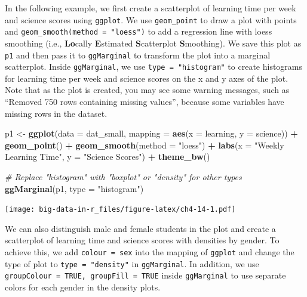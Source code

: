 \documentclass[]{book}
\newenvironment{Shaded}{\begin{snugshade}}{\end{snugshade}}
\newcommand{\CommentTok}[1]{\textcolor[rgb]{0.56,0.35,0.01}{\textit{#1}}}
\newcommand{\DataTypeTok}[1]{\textcolor[rgb]{0.13,0.29,0.53}{#1}}
\newcommand{\KeywordTok}[1]{\textcolor[rgb]{0.13,0.29,0.53}{\textbf{#1}}}
\newcommand{\NormalTok}[1]{#1}
\newcommand{\OperatorTok}[1]{\textcolor[rgb]{0.81,0.36,0.00}{\textbf{#1}}}
\newcommand{\StringTok}[1]{\textcolor[rgb]{0.31,0.60,0.02}{#1}}
\begin{document}
In the following example, we first create a scatterplot of learning time per week and science scores using \texttt{ggplot}. We use \texttt{geom\_point} to draw a plot with points and \texttt{geom\_smooth(method\ =\ "loess")} to add a regression line with loess smoothing (i.e., \textbf{Lo}cally \textbf{E}stimated \textbf{S}catterplot \textbf{S}moothing). We save this plot as \texttt{p1} and then pass it to \texttt{ggMarginal} to transform the plot into a marginal scatterplot. Inside \texttt{ggMarginal}, we use \texttt{type\ =\ "histogram"} to create histograms for learning time per week and science scores on the x and y axes of the plot. Note that as the plot is created, you may see some warning messages, such as ``Removed 750 rows containing missing values'', because some variables have missing rows in the dataset.

\begin{Shaded}
\begin{Highlighting}[]
\NormalTok{p1 <-}\StringTok{ }\KeywordTok{ggplot}\NormalTok{(}\DataTypeTok{data =}\NormalTok{ dat_small,}
             \DataTypeTok{mapping =} \KeywordTok{aes}\NormalTok{(}\DataTypeTok{x =}\NormalTok{ learning, }\DataTypeTok{y =}\NormalTok{ science)) }\OperatorTok{+}
\StringTok{  }\KeywordTok{geom_point}\NormalTok{() }\OperatorTok{+}
\StringTok{  }\KeywordTok{geom_smooth}\NormalTok{(}\DataTypeTok{method =} \StringTok{"loess"}\NormalTok{) }\OperatorTok{+}
\StringTok{  }\KeywordTok{labs}\NormalTok{(}\DataTypeTok{x =} \StringTok{"Weekly Learning Time"}\NormalTok{, }\DataTypeTok{y =} \StringTok{"Science Scores"}\NormalTok{) }\OperatorTok{+}
\StringTok{  }\KeywordTok{theme_bw}\NormalTok{()}

\CommentTok{# Replace "histogram" with "boxplot" or "density" for other types}
\KeywordTok{ggMarginal}\NormalTok{(p1, }\DataTypeTok{type =} \StringTok{"histogram"}\NormalTok{)}
\end{Highlighting}
\end{Shaded}

\texttt{[image: big-data-in-r\_files/figure-latex/ch4-14-1.pdf]}

We can also distinguish male and female students in the plot and create a scatterplot of learning time and science scores with densities by gender. To achieve this, we add \texttt{colour\ =\ sex} into the mapping of \texttt{ggplot} and change the type of plot to \texttt{type\ =\ "density"} in \texttt{ggMarginal}. In addition, we use \texttt{groupColour\ =\ TRUE,\ groupFill\ =\ TRUE} inside \texttt{ggMarginal} to use separate colors for each gender in the density plots.
\end{document}
